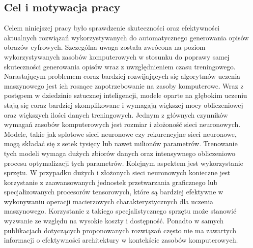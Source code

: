 \subsection{Cel i motywacja pracy}
Celem niniejszej pracy było sprawdzenie skuteczności oraz efektywności aktualnych rozwiązań wykorzystywanych do automatycznego generowania opisów obrazów cyfrowych. Szczególna uwaga została zwrócona na poziom wykorzystywanych zasobów komputerowych w stosunku do poprawy samej skuteczności generowania opisów wraz z uwzględnieniem czasu treningowego. Narastającym problemem coraz bardziej rozwijających się algorytmów uczenia maszynowego jest ich rosnące zapotrzebowanie na zasoby komputerowe. Wraz z postępem w dziedzinie sztucznej inteligencji, modele oparte na głębokim uczeniu stają się coraz bardziej skomplikowane i wymagają większej mocy obliczeniowej oraz większych ilości danych treningowych. Jednym z głównych czynników wymagań zasobów komputerowych jest rozmiar i złożoność sieci neuronowych. Modele, takie jak splotowe sieci neuronowe czy rekurencyjne sieci neuronowe, mogą składać się z setek tysięcy lub nawet milionów parametrów. Trenowanie tych modeli wymaga dużych zbiorów danych oraz intensywnego obliczeniowo procesu optymalizacji tych parametrów. Kolejnym aspektem jest wykorzystanie sprzętu. W przypadku dużych i złożonych sieci neuronowych konieczne jest korzystanie z zaawansowanych jednostek przetwarzania graficznego lub specjalizowanych procesorów tensorowych, które są bardziej efektywne w wykonywaniu operacji macierzowych charakterystycznych dla uczenia maszynowego. Korzystanie z takiego specjalistycznego sprzętu może stanowić wyzwanie ze względu na wysokie koszty i dostępność. Ponadto w samych publikacjach dotyczących proponowanych rozwiązań często nie ma zawartych informacji o efektywności architektury w kontekście zasobów komputerowych.
